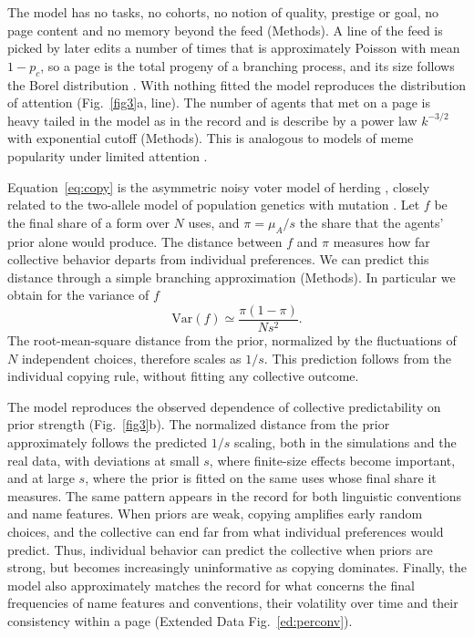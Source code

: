 \documentclass[11pt]{article}
\begin{document}
The model has no tasks, no cohorts, no notion of quality, prestige or goal, no page content and no memory beyond the feed (Methods). A line of the feed is picked by later edits a number of times that is approximately Poisson with mean $1-p_c$, so a page is the total progeny of a branching process, and its size follows the Borel distribution \cite{borel1942}. With nothing fitted the model reproduces the distribution of attention (Fig.~\ref{fig3}a, line). The number of agents that met on a page is heavy tailed in the model as in the record and is describe by a power law $k^{-3/2}$ with exponential cutoff (Methods). This is analogous to models of meme popularity under limited attention \cite{gleeson2014}.

Equation~\eqref{eq:copy} is the asymmetric noisy voter model of herding \cite{kirman1993,alfarano2005}, closely related to the two-allele model of population genetics with mutation \cite{wright1931}. Let $f$ be the final share of a form over $N$ uses, and $\pi=\mu_A/s$ the share that the agents' prior alone would produce. The distance between $f$ and $\pi$ measures how far collective behavior departs from individual preferences. We can predict this distance through a simple branching approximation (Methods). In particular we obtain for the variance of $f$
\begin{equation}
\mathrm{Var}(f)\simeq\frac{\pi(1-\pi)}{Ns^2}.
\label{eq}
\end{equation}
The root-mean-square distance from the prior, normalized by the fluctuations of $N$ independent choices, therefore scales as $1/s$. This prediction follows from the individual copying rule, without fitting any collective outcome.

The model reproduces the observed dependence of collective predictability on prior strength (Fig.~\ref{fig3}b). The normalized distance from the prior approximately follows the predicted $1/s$ scaling, both in the simulations and the real data, with deviations at small $s$, where finite-size effects become important, and at large $s$, where the prior is fitted on the same uses whose final share it measures. The same pattern appears in the record for both linguistic conventions and name features. When priors are weak, copying amplifies early random choices, and the collective can end far from what individual preferences would predict. Thus, individual behavior can predict the collective when priors are strong, but becomes increasingly uninformative as copying dominates. Finally, the model also approximately matches the record for what concerns the final frequencies of name features and conventions, their volatility over time and their consistency within a page (Extended Data Fig.~\ref{ed:perconv}). 
\end{document}
